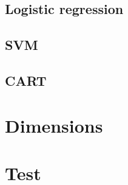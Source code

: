\documentclass[a4paper,draft=false]{scrreprt}
\begin{document}
\section{Logistic regression} %
\section{SVM} %
\section{CART} %



\chapter{Dimensions}

\chapter{Test}


\appendix
\appendixpage
\end{document}
